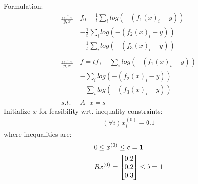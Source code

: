 \documentclass[12pt,letter]{article}
\begin{document}
\begin{enumerate}
\begin{itemize}
    Formulation:
    \begin{align*}
      \min_{y,x}\ & f_0 - \frac{1}{t} \sum_i log(-(f_1(x)_i - y))\\
                  & - \frac{1}{t} \sum_i log(-(f_2(x)_i - y))\\
                  & - \frac{1}{t} \sum_i log(-(f_3(x)_i - y))\\
      \\
      \min_{y,x}\ & f = t f_0 - \sum_i log(-(f_1(x)_i - y))\\
                  & - \sum_i log(-(f_2(x)_i - y))\\
                  & - \sum_i log(-(f_3(x)_i - y))\\
      s.t.\ &A^{+}x = s
    \end{align*}
    Initialize $x$ for feasibility wrt. inequality constraints:
    \begin{align*}
      (\forall i) x_i^{(0)} = 0.1
    \end{align*}
    where inequalities are:
    \begin{align*}
      &0 \leq x^{(0)} \leq c = \bold{1}\\
      &Bx^{(0)} =
        \begin{bmatrix}
          0.2\\0.2\\0.3
        \end{bmatrix}
      \leq b = \bold{1}\\
    \end{align*}


\end{itemize}
\end{enumerate}
\end{document}
